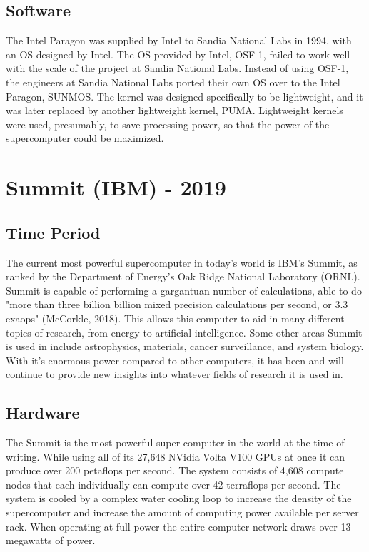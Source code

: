 \documentclass[letterpaper, 10 pt, conference]{IEEEconf}
\begin{document}
\subsection{Software}
The Intel Paragon was supplied by Intel to Sandia National Labs in
1994, with an OS designed by Intel. The OS provided by Intel,
OSF-1, failed to work well with the scale of the project at Sandia
National Labs. Instead of using OSF-1, the engineers at Sandia
National Labs ported their own OS over to the Intel Paragon,
SUNMOS. The kernel was designed specifically to be lightweight,
and it was later replaced by another lightweight kernel, PUMA.
Lightweight kernels were used, presumably, to save processing
power, so that the power of the supercomputer could be maximized.


\section{Summit (IBM) - 2019}
\subsection{Time Period}
The current most powerful supercomputer in today's world is IBM's Summit, as ranked by the Department of Energy's Oak Ridge National Laboratory (ORNL). Summit is capable of performing a gargantuan number of calculations, able to do "more than three billion billion mixed precision calculations per second, or 3.3 exaops" (McCorkle, 2018). This allows this computer to aid in many different topics of research, from energy to artificial intelligence. Some other areas Summit is used in include astrophysics, materials, cancer surveillance, and system biology. With it's enormous power compared to other computers, it has been and will continue to provide new insights into whatever fields of research it is used in.
\subsection{Hardware}
The Summit is the most powerful super computer in the world at the time of writing. While using all of its 27,648 NVidia Volta V100 GPUs at once it can produce over 200 petaflops per second. The system consists of 4,608 compute nodes that each individually can compute over 42 terraflops per second. The system is cooled by a complex water cooling loop to increase the density of the supercomputer and increase the amount of computing power available per server rack. When operating at full power the entire computer network draws over 13 megawatts of power.
\end{document}
